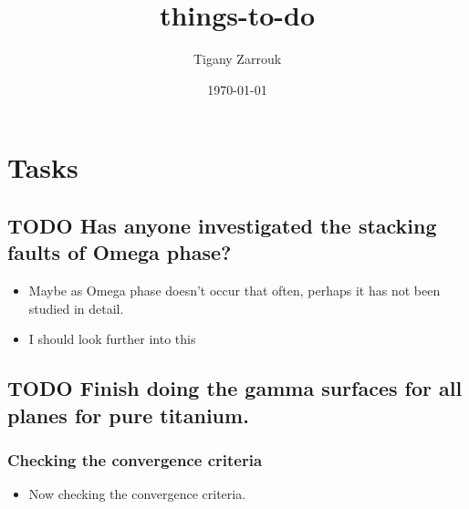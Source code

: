 \documentclass[11pt]{article}
\author{Tigany Zarrouk}
\date{\today}
\title{things-to-do}
\begin{document}
\maketitle
\tableofcontents





\section{Tasks}
\label{sec:orga219a3f}

\subsection{{\bfseries\sffamily TODO} Has anyone investigated the stacking faults of Omega phase?}
\label{sec:org435cb98}
\begin{itemize}
\item Maybe as Omega phase doesn't occur that often, perhaps it has not been
studied in detail.
\item I should look further into this
\end{itemize}
\subsection{{\bfseries\sffamily TODO} Finish doing the gamma surfaces for all planes for pure titanium.}
\label{sec:org8de5fdf}
\subsubsection{Checking the convergence criteria}
\label{sec:orgbb149e3}
\begin{itemize}
\item Now checking the convergence criteria.
\end{itemize}
\end{document}
